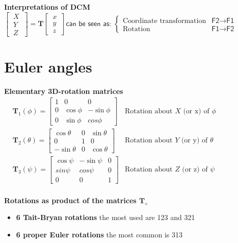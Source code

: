 \documentclass[a4paper, 12pt]{article}
\begin{document}
{{    \noindent
    \textbf{Interpretations of DCM}
    $\begin{bmatrix}
        \ X \ \\ \ Y \ \\\ Z \
    \end{bmatrix} = 
    \mathbf{T} 
    \begin{bmatrix}
       \ x \ \\ \ y \ \\ \ z \
    \end{bmatrix} \textsf{can be seen as: }
    \begin{cases}
        \text{Coordinate transformation} & \textsf{F2}\to\textsf{F1}\\
        \text{Rotation} & \textsf{F1}\to\textsf{F2}
    \end{cases} 
    $
}}

    \vspace{-0.5cm}
\section*{Euler angles}
{\small{



\textbf{Elementary 3D-rotation matrices} 
$
\begin{aligned}
    &\mathbf{T}_1(\phi) = 
    \begin{bmatrix}
        1&0&0\\
        0&\cos\phi&-\sin\phi\\
        0&\sin\phi&cos\phi
    \end{bmatrix} & \text{Rotation about $X$ (or x) of $\phi$ }\\
    &\mathbf{T}_2(\theta) = 
    \begin{bmatrix}
        \cos\theta&0&\sin\theta\\
        0&1&0\\
        -\sin\theta&0&\cos\theta
    \end{bmatrix}  & \text{Rotation about $Y$ (or y) of $\theta$ } \\
    &\mathbf{T}_3(\psi) = \begin{bmatrix}
        \cos\psi&-\sin\psi&0\\
        sin\psi&cos\psi&0\\
        0&0&1
    \end{bmatrix}
    & \text{Rotation about $Z$ (or z) of $\psi$ }\\
\end{aligned}
$

\noindent
\textbf{Rotations as product of the matrices $\mathbf{T}_\diamond$}
\begin{itemize}
    \itemsep0em
    \item[\ding{70}] \textbf{6 Tait-Bryan rotations} the most used are 123 and 321
    \item[\ding{70}] \textbf{6 proper Euler rotations} the most common is 313
\end{itemize}

}}
\end{document}
